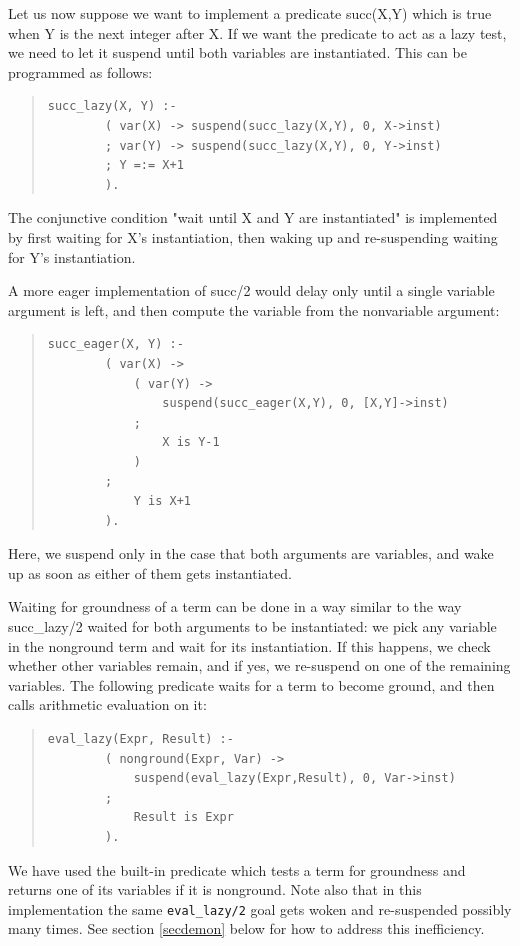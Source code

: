 Let us now suppose we want to implement a predicate succ(X,Y) which
is true when Y is the next integer after X. If we want the predicate
to act as a lazy test, we need to let it suspend until both variables
are instantiated. This can be programmed as follows:
\begin{quote}\begin{verbatim}
succ_lazy(X, Y) :-
        ( var(X) -> suspend(succ_lazy(X,Y), 0, X->inst)
        ; var(Y) -> suspend(succ_lazy(X,Y), 0, Y->inst)
        ; Y =:= X+1
        ).
\end{verbatim}\end{quote}
The conjunctive condition "wait until X and Y are instantiated" is
implemented by first waiting for X's instantiation, then waking up and
re-suspending waiting for Y's instantiation.

A more eager implementation of succ/2 would delay only until
a single variable argument is left, and then compute the variable from
the nonvariable argument:
\begin{quote}\begin{verbatim}
succ_eager(X, Y) :-
        ( var(X) ->
            ( var(Y) ->
                suspend(succ_eager(X,Y), 0, [X,Y]->inst)
            ;
                X is Y-1
            )
        ;
            Y is X+1
        ).
\end{verbatim}\end{quote}
Here, we suspend only in the case that both arguments are variables,
and wake up as soon as either of them gets instantiated.

Waiting for groundness of a term can be done in a way similar to the
way succ_lazy/2 waited for both arguments to be instantiated: we pick
any variable in the nonground term and wait for its instantiation.
If this happens, we check whether other variables remain, and if yes,
we re-suspend on one of the remaining variables. The following predicate
waits for a term to become ground, and then calls arithmetic evaluation on it:
\begin{quote}\begin{verbatim}
eval_lazy(Expr, Result) :-
        ( nonground(Expr, Var) ->
            suspend(eval_lazy(Expr,Result), 0, Var->inst)
        ;
            Result is Expr
        ).
\end{verbatim}\end{quote}
We have used the built-in predicate
which tests a term for groundness and returns one of its variables
if it is nonground. Note also that in this implementation the same
\verb.eval_lazy/2. goal gets woken and re-suspended possibly many times.
See section \ref{secdemon} below for how to address this inefficiency.


